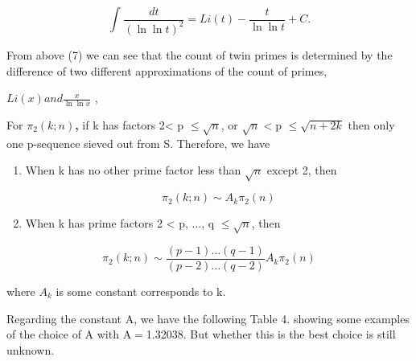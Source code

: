 \documentclass{article}
\begin{document}
\begin{equation}
 \int_{}^{}\frac{dt}{(\ln \ln  t)^{2}} =  Li\left(t\right)-\frac{t}{\ln \ln  t }+C  .
\end{equation}

\vspace{1\baselineskip}

 From above (7) we can see that the count of twin primes is determined by the difference of two different approximations of the count of primes,
 
\vspace{1\baselineskip}

\( Li\left(x\right)  and \frac{x}{\ln \ln  x }\) ,

\vspace{1\baselineskip}

For \( \pi_{2}\left(k;n\right)\)\textbf{, }if k has factors 2< p $\leq$\( \sqrt{n}\),  or \(\sqrt{n}<\)p $\leq$\( \sqrt{n+2k} \) then only one p-sequence sieved out from S.  Therefore, we have 

\begin{enumerate}
	\item When k has no other prime factor less than \(\sqrt{n}\) except 2, then

\begin{equation}
\pi_{2}\left(k;n\right) \sim  A_{k} \pi_{2}\left(n\right)
\end{equation}
\vspace{1\baselineskip}

	\item When k has prime factors 2 < p, $\ldots$, q $\leq$\( \sqrt{n}\), then

\end{enumerate}
\begin{equation}
\pi_{2}\left(k;n\right) \sim \frac{\left(p-1\right)\ldots (q-1)  }{\left(p-2\right)\ldots (q-2)  } A_{k} \pi_{2}\left(n\right)
\end{equation}

\begin{flushleft}
where \( A_{k}\) is some constant corresponds to k.
\vspace{1\baselineskip}

Regarding the constant A, we have the following Table 4. showing some examples of the choice of A with A$=$1.32038.  But whether this is the best choice is still unknown. 
\end{flushleft}
\end{document}
